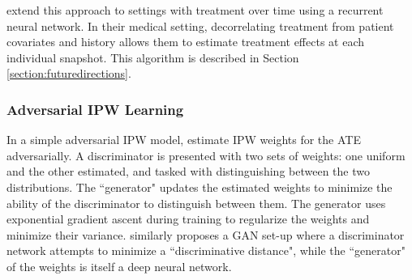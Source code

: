 \citet{bica2020estimating} extend this approach to settings with treatment over time using a recurrent neural network. In their medical setting, decorrelating treatment from patient covariates and history allows them to estimate treatment effects at each individual snapshot. This algorithm is described in Section \ref{section:futuredirections}.

\subsubsection{Adversarial IPW Learning}

In a simple adversarial IPW model, \citet{Ozery-flato} estimate IPW weights for the ATE adversarially. A discriminator is presented with two sets of weights: one uniform and the other estimated, and tasked with distinguishing between the two distributions. The ``generator" updates the estimated weights to minimize the ability of the discriminator to distinguish between them. The generator uses exponential gradient ascent during training to regularize the weights and minimize their variance. \citet{KallusDeepMatch} similarly proposes a GAN set-up where a discriminator network attempts to minimize a ``discriminative distance", while the ``generator" of the weights is itself a deep neural network.
